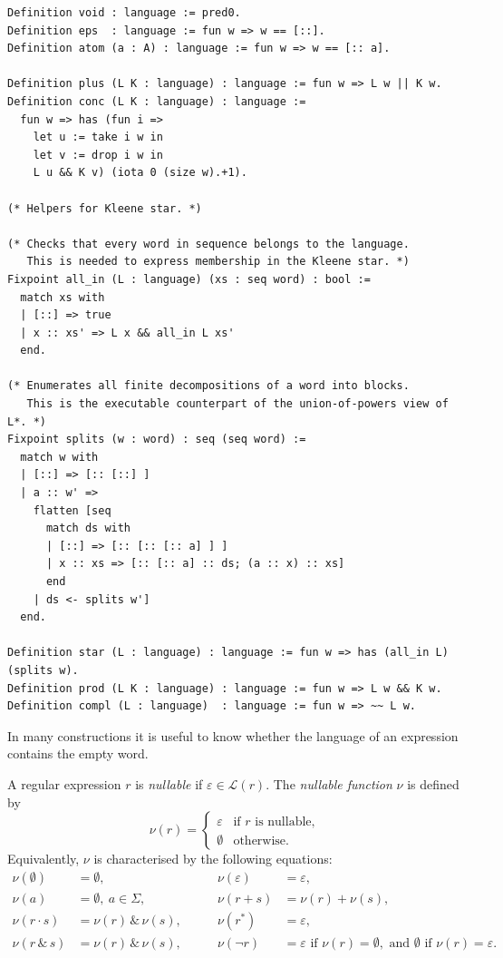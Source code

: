 \begin{lstlisting}[style=rocqstyle,caption={The language operations (\texttt{Languages.v}).},label={lst:langops}]
Definition void : language := pred0.
Definition eps  : language := fun w => w == [::].
Definition atom (a : A) : language := fun w => w == [:: a].

Definition plus (L K : language) : language := fun w => L w || K w.
Definition conc (L K : language) : language :=
  fun w => has (fun i =>
    let u := take i w in
    let v := drop i w in
    L u && K v) (iota 0 (size w).+1).

(* Helpers for Kleene star. *)

(* Checks that every word in sequence belongs to the language.
   This is needed to express membership in the Kleene star. *)
Fixpoint all_in (L : language) (xs : seq word) : bool :=
  match xs with
  | [::] => true
  | x :: xs' => L x && all_in L xs'
  end.

(* Enumerates all finite decompositions of a word into blocks.
   This is the executable counterpart of the union-of-powers view of L*. *)
Fixpoint splits (w : word) : seq (seq word) :=
  match w with
  | [::] => [:: [::] ]
  | a :: w' =>
    flatten [seq
      match ds with
      | [::] => [:: [:: [:: a] ] ]
      | x :: xs => [:: [:: a] :: ds; (a :: x) :: xs]
      end
    | ds <- splits w']
  end.

Definition star (L : language) : language := fun w => has (all_in L) (splits w).
Definition prod (L K : language) : language := fun w => L w && K w.
Definition compl (L : language)  : language := fun w => ~~ L w.
\end{lstlisting}

In many constructions it is useful to know whether the language of an expression
contains the empty word.

\begin{definition}[Nullability]\label{def:nullable}
A regular expression $r$ is \emph{nullable} if $\varepsilon \in \mathcal{L}(r)$. The
\emph{nullable function} $\nu$ is defined by
\[
  \nu(r) =
  \begin{cases}
    \varepsilon & \text{if $r$ is nullable},\\
    \emptyset   & \text{otherwise.}
  \end{cases}
\]
Equivalently, $\nu$ is characterised by the following equations:
\[
\begin{aligned}
     \nu(\emptyset)      &= \emptyset, &\qquad
     \nu(\varepsilon)    &= \varepsilon, \\
     \nu(a)              &= \emptyset,\ a \in \Sigma, &\qquad
     \nu(r+s)            &= \nu(r) + \nu(s), \\
     \nu(r\cdot s)       &= \nu(r)\,\&\,\nu(s), &\qquad
     \nu(r^*)            &= \varepsilon, \\
     \nu(r\,\&\,s)       &= \nu(r)\,\&\,\nu(s), &\qquad
     \nu(\neg r)         &= \varepsilon \text{ if } \nu(r) = \emptyset,
                            \text{ and } \emptyset \text{ if } \nu(r) = \varepsilon.
\end{aligned}
\]
\end{definition}

